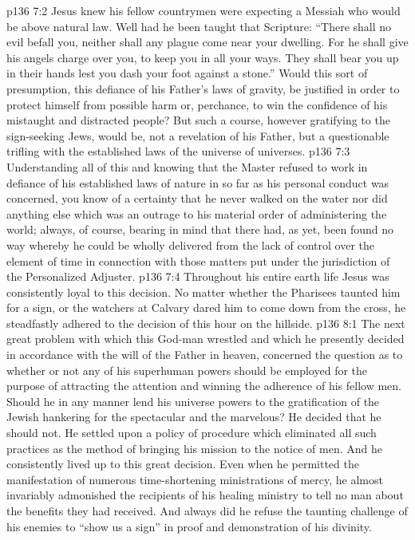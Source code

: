 \vs p136 7:2 Jesus knew his fellow countrymen were expecting a Messiah who would be above natural law. Well had he been taught that Scripture: “There shall no evil befall you, neither shall any plague come near your dwelling. For he shall give his angels charge over you, to keep you in all your ways. They shall bear you up in their hands lest you dash your foot against a stone.” Would this sort of presumption, this defiance of his Father’s laws of gravity, be justified in order to protect himself from possible harm or, perchance, to win the confidence of his mistaught and distracted people? But such a course, however gratifying to the sign\hyp{}seeking Jews, would be, not a revelation of his Father, but a questionable trifling with the established laws of the universe of universes.
\pc \vs p136 7:3 Understanding all of this and knowing that the Master refused to work in defiance of his established laws of nature in so far as his personal conduct was concerned, you know of a certainty that he never walked on the water nor did anything else which was an outrage to his material order of administering the world; always, of course, bearing in mind that there had, as yet, been found no way whereby he could be wholly delivered from the lack of control over the element of time in connection with those matters put under the jurisdiction of the Personalized Adjuster.
\vs p136 7:4 Throughout his entire earth life Jesus was consistently loyal to this decision. No matter whether the Pharisees taunted him for a sign, or the watchers at Calvary dared him to come down from the cross, he steadfastly adhered to the decision of this hour on the hillside.
\vs p136 8:1 The next great problem with which this God\hyp{}man wrestled and which he presently decided in accordance with the will of the Father in heaven, concerned the question as to whether or not any of his superhuman powers should be employed for the purpose of attracting the attention and winning the adherence of his fellow men. Should he in any manner lend his universe powers to the gratification of the Jewish hankering for the spectacular and the marvelous? He decided that he should not. He settled upon a policy of procedure which eliminated all such practices as the method of bringing his mission to the notice of men. And he consistently lived up to this great decision. Even when he permitted the manifestation of numerous time\hyp{}shortening ministrations of mercy, he almost invariably admonished the recipients of his healing ministry to tell no man about the benefits they had received. And always did he refuse the taunting challenge of his enemies to “show us a sign” in proof and demonstration of his divinity.
